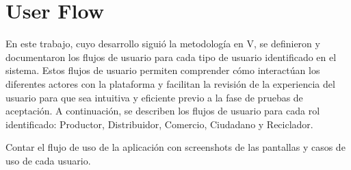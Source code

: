 \chapter{User Flow}
\label{cp:user-flow}

\parindent0pt

En este trabajo, cuyo desarrollo siguió la metodología en V, se definieron y documentaron los flujos de usuario para cada tipo de usuario identificado en el sistema. Estos flujos de usuario permiten comprender cómo interactúan los diferentes actores con la plataforma y facilitan la revisión de la experiencia del usuario para que sea intuitiva y eficiente previo a la fase de pruebas de aceptación. A continuación, se describen los flujos de usuario para cada rol identificado: Productor, Distribuidor, Comercio, Ciudadano y Reciclador.

Contar el flujo de uso de la aplicación con screenshots de las pantallas y casos de uso de cada usuario.
